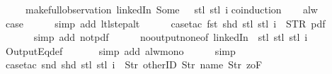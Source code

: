 \begin{isabellebody}
\ \ \ \ \ {\isacharparenleft}make{\isacharunderscore}full{\isacharunderscore}observation\ linkedIn\ {\isacharparenleft}Some\ {}{\isacharparenright}\ {\isacharless}{\isachargreater}\ {\isacharparenleft}stl\ {\isacharparenleft}stl\ i{\isacharparenright}{\isacharparenright}{\isacharparenright}{\isachardoublequoteclose}\isanewline
%
\isadelimproof
%
\endisadelimproof
%
\isatagproof
{}\isamarkupfalse%
{\isacharparenleft}coinduction{\isacharparenright}\isanewline
\ \ \isamarkupfalse%
\ alw\isanewline
\ \ \isamarkupfalse%
\ \isamarkupfalse%
\ {\isacharquery}case\isanewline
\ \ \ \ \isamarkupfalse%
\ {\isacharparenleft}simp\ add{\isacharcolon}\ ltl{\isacharunderscore}step{\isacharunderscore}alt{\isacharparenright}\isanewline
\ \ \ \ \isamarkupfalse%
\ {\isacharparenleft}case{\isacharunderscore}tac\ {\isachardoublequoteopen}{\isacharparenleft}fst\ {\isacharparenleft}shd\ {\isacharparenleft}stl\ {\isacharparenleft}stl\ i{\isacharparenright}{\isacharparenright}{\isacharparenright}{\isacharparenright}\ {\isacharequal}\ STR\ {\isacharprime}{\isacharprime}pdf{\isacharprime}{\isacharprime}{\isachardoublequoteclose}{\isacharparenright}\isanewline
\ \ \ \ \ \isamarkupfalse%
\isanewline
\ \ \ \ \ \isamarkupfalse%
\ {\isacharparenleft}simp\ add{\isacharcolon}\ not{\isacharunderscore}pdf{\isacharunderscore}{}{\isacharparenright}\isanewline
\ \ \ \ \isamarkupfalse%
\ no{\isacharunderscore}output{\isacharunderscore}none{\isacharbrackleft}of\ linkedIn\ {\isachardoublequoteopen}{\isacharless}{\isachargreater}{\isachardoublequoteclose}\ {\isachardoublequoteopen}stl\ {\isacharparenleft}stl\ {\isacharparenleft}stl\ i{\isacharparenright}{\isacharparenright}{\isachardoublequoteclose}{\isacharbrackright}\isanewline
\ \ \ \ \isamarkupfalse%
\ OutputEq{\isacharunderscore}def\isanewline
\ \ \ \ \ \isamarkupfalse%
\ {\isacharparenleft}simp\ add{\isacharcolon}\ alw{\isacharunderscore}mono{\isacharparenright}\isanewline
\ \ \ \ \isamarkupfalse%
\ simp\isanewline
\ \ \ \ \isamarkupfalse%
\ {\isacharparenleft}case{\isacharunderscore}tac\ {\isachardoublequoteopen}{\isacharparenleft}snd\ {\isacharparenleft}shd\ {\isacharparenleft}stl\ {\isacharparenleft}stl\ i{\isacharparenright}{\isacharparenright}{\isacharparenright}{\isacharparenright}\ {\isacharequal}\ {\isacharbrackleft}Str\ {\isacharprime}{\isacharprime}otherID{\isacharprime}{\isacharprime}{\isacharcomma}\ Str\ {\isacharprime}{\isacharprime}name{\isacharprime}{\isacharprime}{\isacharcomma}\ Str\ {\isacharprime}{\isacharprime}{}zoF{\isacharprime}{\isacharprime}{\isacharbrackright}{\isachardoublequoteclose}{\isacharparenright}\isanewline

\end{isabellebody}
